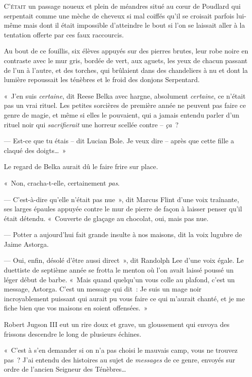 
\lettrine{C}{'était} un passage noueux et plein de méandres situé au cœur de Poudlard qui serpentait comme une mèche de cheveux si mal coiffés qu'il se croisait parfois lui-même mais dont il était impossible d'atteindre le bout si l'on se laissait aller à la tentation offerte par ces faux raccourcis.

Au bout de ce fouillis, six élèves appuyés sur des pierres brutes, leur robe noire en contraste avec le mur gris, bordée de vert, aux aguets, les yeux de chacun passant de l'un à l'autre, et des torches, qui brûlaient dans des chandeliers à nu et dont la lumière repoussait les ténèbres et le froid des donjons Serpentard.

«~J'en suis \emph{certaine}, dit Reese Belka avec hargne, absolument \emph{certaine}, ce n'était pas un vrai rituel.
Les petites sorcières de première année ne peuvent pas faire ce genre de magie, et même si elles le pouvaient, qui a jamais entendu parler d'un rituel noir qui \emph{sacrifierait} une horreur scellée contre -- \emph{ça}~?

--- Est-ce que tu étais -- dit Lucian Bole.
Je veux dire -- après que cette fille a claqué des doigts…~»

Le regard de Belka aurait dû le faire frire sur place.

«~Non, cracha-t-elle, certainement \emph{pas}.

--- C'est-à-dire qu'elle n'était pas nue~», dit Marcus Flint d'une voix traînante, ses larges épaules appuyée contre le mur de pierre de façon à laisser penser qu'il était détendu.
«~Couverte de glaçage au chocolat, oui, mais pas nue.

--- Potter a aujourd'hui fait grande insulte à nos maisons, dit la voix lugubre de Jaime Astorga.

--- Oui, enfin, désolé d'être aussi direct~», dit Randolph Lee d'une voix égale.
Le duettiste de septième année se frotta le menton où l'on avait laissé poussé un léger début de barbe.
«~Mais quand quelqu'un vous colle au plafond, c'est un message, Astorga.
C'est un message qui dit~: Je suis un mage noir incroyablement puissant qui aurait pu vous faire ce qui m'aurait chanté, et je me fiche bien que vos maisons en soient offensées.~»

Robert Jugson III eut un rire doux et grave, un gloussement qui envoya des frissons descendre le long de plusieurs échines.

«~C'est à s'en demander si on n'a pas choisi le mauvais camp, vous ne trouvez pas~?
J'ai entendu des histoires au sujet de \emph{messages} de ce genre, envoyés sur ordre de l'ancien Seigneur des Ténèbres…

